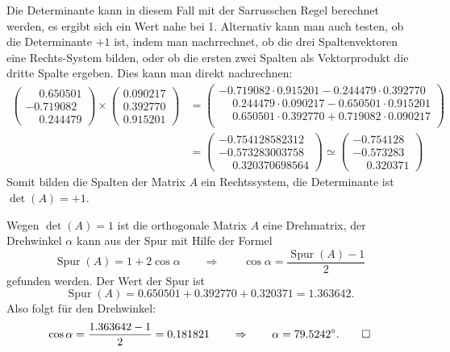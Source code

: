 \begin{loesung}
\begin{teilaufgaben}
Die Determinante kann in diesem Fall mit der Sarrusschen Regel
berechnet werden, es ergibt sich ein Wert nahe bei 1.
Alternativ kann man auch testen, ob die Determinante $+1$ ist,
indem man nachrrechnet, ob die drei Spaltenvektoren eine
Rechts-System bilden, oder ob die ersten zwei Spalten als Vektorprodukt
die dritte Spalte ergeben. Dies kann man direkt nachrechnen:
\begin{align*}
\begin{pmatrix}
\phantom{-}0.650501\\
  -0.719082\\
\phantom{-}0.244479
\end{pmatrix}
\times
\begin{pmatrix}
0.090217\\
0.392770\\
0.915201
\end{pmatrix}
&=
\begin{pmatrix}
-0.719082\cdot 0.915201 - 0.244479\cdot 0.392770\\
\phantom{-}0.244479\cdot 0.090217 - 0.650501\cdot 0.915201\\
\phantom{-}0.650501\cdot 0.392770 + 0.719082\cdot 0.090217\\
\end{pmatrix}
\\
&=
\begin{pmatrix}
%
-0.754128582312\\
-0.573283003758\\
\phantom{-}0.320370698564
\end{pmatrix}
\simeq
\begin{pmatrix}
-0.754128\\
-0.573283\\
\phantom{-}0.320371
\end{pmatrix}
\end{align*}
Somit bilden die Spalten der Matrix $A$ ein Rechtssystem, die Determinante
ist $\det(A)=+1$.
\item Wegen $\det(A)=1$ ist die orthogonale Matrix $A$ eine Drehmatrix,
der Drehwinkel $\alpha$ kann aus der Spur mit Hilfe der Formel
\[
\operatorname{Spur}(A)=1+2\cos\alpha\qquad\Rightarrow\qquad
\cos\alpha=\frac{\operatorname{Spur}(A)-1}2
\]
gefunden werden. Der Wert der Spur ist
\[
\operatorname{Spur}(A) = 0.650501  + 0.392770  + 0.320371 = 1.363642.
\]
Also folgt für den Drehwinkel:
\[
\cos\alpha=\frac{1.363642-1}2= 0.181821\qquad\Rightarrow\qquad
\alpha=79.5242^\circ.
\qedhere
\]
\end{teilaufgaben}
\end{loesung}

